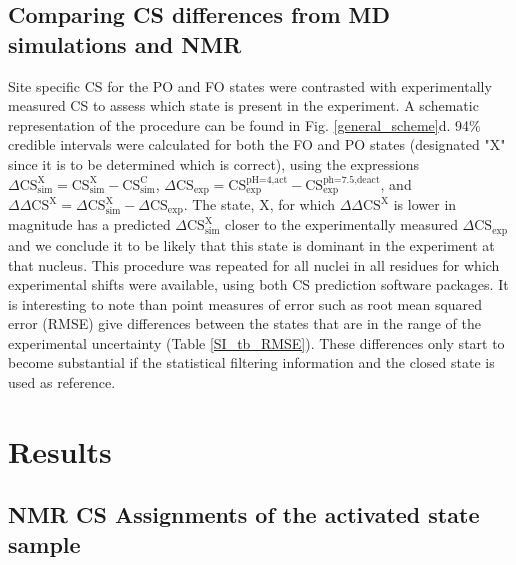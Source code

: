 \documentclass[%
 aip,
 amsmath,amssymb,
 preprint,%
]{revtex4-1}
\begin{document}
\subsection{Comparing CS differences from MD simulations and NMR}
Site specific CS for the PO and FO states were contrasted with experimentally measured CS to assess which state is present in the experiment. A schematic representation of the procedure can be found in Fig. \ref{general_scheme}d. 94\% credible intervals were calculated for both the FO and PO states (designated "X" since it is to be determined which is correct), using the expressions $\Delta \text{CS}_\text{sim}^\text{X}=\text{CS}_\text{sim}^\text{X}-\text{CS}_\text{sim}^\text{C}$, $\Delta \text{CS}_\text{exp}=\text{CS}_\text{exp}^\text{pH=4,act}-\text{CS}_\text{exp}^\text{ph=7.5,deact}$, and $\Delta\Delta \text{CS}^\text{X}=\Delta \text{CS}_\text{sim}^\text{X} - \Delta \text{CS}_\text{exp}$. The state, X, for which $\Delta\Delta \text{CS}^\text{X}$ is lower in magnitude has a predicted $\Delta \text{CS}_\text{sim}^\text{X}$ closer to the experimentally measured $\Delta \text{CS}_\text{exp}$ and we conclude it to be likely that this state is dominant in the experiment at that nucleus. This procedure was repeated for all nuclei in all residues for which experimental shifts were available, using both CS prediction software packages. It is interesting to note than point measures of error such as root mean squared error (RMSE) give differences between the states that are in the range of the experimental uncertainty (Table \ref{SI_tb_RMSE}). These differences only start to become substantial if the statistical filtering information and the closed state is used as reference. 

\section{Results}

\subsection{NMR CS Assignments of the activated state sample}
\end{document}

